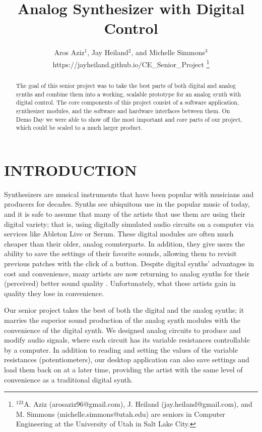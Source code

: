 \documentclass[letterpaper, 12 pt, conference]{ieeeconf}
\title{\LARGE \bf
Analog Synthesizer with Digital Control
}
\author{Aros Aziz$^{1}$, Jay Heiland$^{2}$, and Michelle Simmons$^{3}$ \\ https://jayheiland.github.io/CE\_Senior\_Project%
\thanks{$^{123}$A. Aziz (arosaziz96@gmail.com), J. Heiland (jay.heiland@gmail.com), and M. Simmons (michelle.simmons@utah.edu) are seniors in Computer Engineering at the University of Utah in Salt Lake City.}%
}
\begin{document}
\maketitle
\thispagestyle{empty}
\pagestyle{empty}

\begin{abstract}
The goal of this senior project was to take the best parts of both digital and analog synths and combine them into a working, scalable prototype for an analog synth with digital control. The core components of this project consist of a software application, synthesizer modules, and the software and hardware interfaces between them. On Demo Day we were able to show off the most important and core parts of our project, which could be scaled to a much larger product. 

\end{abstract}


\section{INTRODUCTION}
Synthesizers are musical instruments that have been popular with musicians and producers for decades. Synths see ubiquitous use in the popular music of today, and it is safe to assume that many of the artists that use them are using their digital variety; that is, using digitally simulated audio circuits on a computer via services like Ableton Live or Serum. These digital modules are often much cheaper than their older, analog counterparts. In addition, they give users the ability to save the settings of their favorite sounds, allowing them to revisit previous patches with the click of a button. Despite digital synths' advantages in cost and convenience, many artists are now returning to analog synths for their (perceived) better sound quality \cite{MAKE}. Unfortunately, what these artists gain in quality they lose in convenience. 

Our senior project takes the best of both the digital and the analog synths; it marries the superior sound production of the analog synth modules with the convenience of the digital synth. We designed analog circuits to produce and modify audio signals, where each circuit has its variable resistances controllable by a computer. In addition to reading and setting the values of the variable resistances (potentiometers), our desktop application can also save settings and load them back on at a later time, providing the artist with the same level of convenience as a traditional digital synth.
\end{document}
